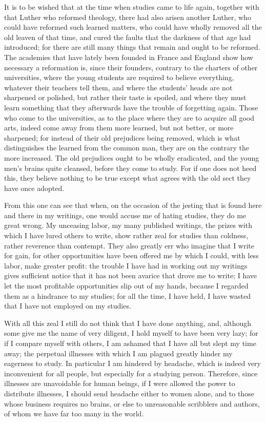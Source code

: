 \documentclass[12pt,a4paper,openany]{book}
\newcommand{\opage}[1]{\marginnote{\footnotesize\textit{[#1]}}}
\begin{document}
It is to be wished that at the time when studies came to life again, together
with that Luther who reformed theology, there had also arisen another Luther,
who could have reformed such learned matters, who could have wholly removed all
the old leaven of that time, and cured the faults that the darkness of that age
had introduced; for there are still many things that remain and ought to be
reformed. The academies that have lately been founded in France and England show
how necessary a reformation is, since their founders, contrary to the charters
of other universities, where the young students are required to believe
everything, whatever their
teachers tell them, and where the students' heads are not sharpened or polished,
but rather their taste is spoiled, and where they must learn something that they
afterwards have the trouble of forgetting again. Those who come to the
universities, as to the place where they are to acquire all good arts, indeed
come away from them more learned, but not better, or more sharpened; for instead
of their old prejudices being removed, which is what distinguishes the learned
from the common man, they are on the contrary the more increased. The old
prejudices ought to be wholly eradicated, and the young men's brains quite
cleansed, before they come to
\setcounter{footnote}{0}%
\opage{9}study. For if one does not heed this, they believe nothing to be true except
what agrees with the old sect they have once adopted.

From this one can see that when, on the occasion of the jesting that is found
here and there in my writings, one would accuse me of hating studies, they do me
great wrong. My unceasing labor, my many published writings, the prizes with
which I have lured others to write, show rather zeal for studies than coldness,
rather reverence than contempt. They also greatly err who imagine that I write
for gain, for other opportunities have been offered me by which I could, with
less labor, make greater profit: the trouble I have had in working out my
writings gives sufficient notice that it has not been avarice that drove me to
write; I have let the most profitable opportunities slip out of my hands,
because I regarded them as a hindrance to my studies; for all the time, I have
held, I have wasted that I have not employed on my studies.

With all this zeal I still do not think that I have done anything, and, although
some give me the name of very diligent, I hold myself to have been very lazy;
for if I compare myself with others, I am ashamed that I have all but slept my
time away; the perpetual illnesses with which I am plagued greatly hinder my
eagerness to study. In particular I am hindered by headache, which is indeed
very inconvenient for all people, but especially for a studying person.
Therefore, since illnesses are unavoidable for human beings, if I were allowed
the power to distribute illnesses, I should send headache either to women alone,
and to those whose business requires no brains, or else to unreasonable
scribblers and authors, of whom we have far too many in the world.
\end{document}
